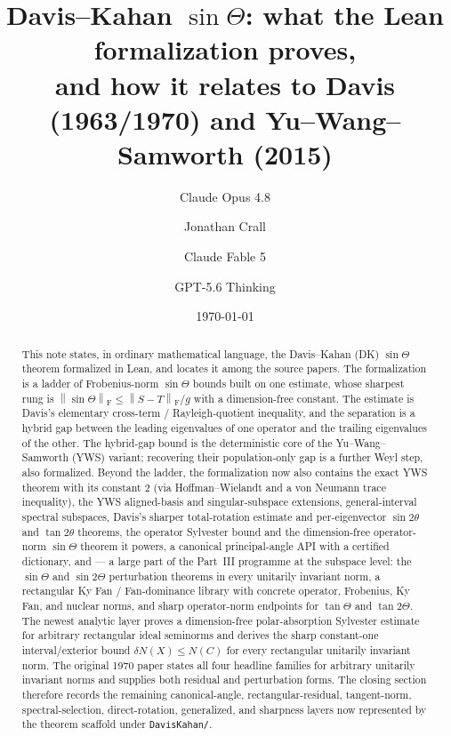 \documentclass[11pt]{article}
\title{Davis--Kahan $\sin\Theta$: what the Lean formalization proves,\\
and how it relates to Davis (1963/1970) and Yu--Wang--Samworth (2015)}
\author{Claude Opus 4.8 \and Jonathan Crall \and Claude Fable 5 \and GPT-5.6 Thinking}
\date{\today}
\newcommand{\norm}[1]{\left\lVert #1\right\rVert}
\newcommand{\F}{\mathrm{F}}
\newcommand{\gap}{g}
\newcommand{\sinT}{\sin\Theta}
\theoremstyle{remark}
\begin{document}
\maketitle

\begin{abstract}
This note states, in ordinary mathematical language, the Davis--Kahan (DK)
$\sin\Theta$ theorem formalized in Lean, and locates it among the source papers.
The formalization is a ladder of Frobenius-norm $\sin\Theta$ bounds built on one
estimate, whose sharpest rung is $\norm{\sinT}_{\F}\le\norm{S-T}_{\F}/\gap$ with a
dimension-free constant.  The estimate is Davis's elementary cross-term /
Rayleigh-quotient inequality, and the separation is a hybrid gap between the
leading eigenvalues of one operator and the trailing eigenvalues of the other.
The hybrid-gap bound is the deterministic core of the Yu--Wang--Samworth (YWS)
variant; recovering their population-only gap is a further Weyl step, also
formalized.  Beyond the ladder, the formalization now also contains the exact
YWS theorem with its constant $2$ (via Hoffman--Wielandt and a von Neumann
trace inequality), the YWS aligned-basis and singular-subspace extensions,
general-interval spectral subspaces, Davis's sharper total-rotation estimate
and per-eigenvector $\sin2\theta$ and $\tan2\theta$ theorems, the operator
Sylvester bound and the dimension-free operator-norm $\sin\Theta$ theorem it
powers, a canonical principal-angle API with a certified dictionary, and ---
a large part of the Part~III programme at the subspace level: the
$\sin\Theta$ and $\sin2\Theta$ perturbation theorems in every unitarily
invariant norm, a rectangular Ky Fan / Fan-dominance library with concrete
operator, Frobenius, Ky Fan, and nuclear norms, and sharp operator-norm
endpoints for $\tan\Theta$ and $\tan2\Theta$.  The newest analytic layer proves
a dimension-free polar-absorption Sylvester estimate for arbitrary rectangular
ideal seminorms and derives the sharp constant-one interval/exterior bound
$\delta N(X)\le N(C)$ for every rectangular unitarily invariant norm.  The
original 1970 paper states all four headline families for arbitrary unitarily
invariant norms and supplies both residual and perturbation forms.  The closing section therefore records
the remaining canonical-angle, rectangular-residual, tangent-norm,
spectral-selection, direct-rotation, generalized, and sharpness layers now
represented by the theorem scaffold under
\texttt{DavisKahan/}.
\end{abstract}
\end{document}
